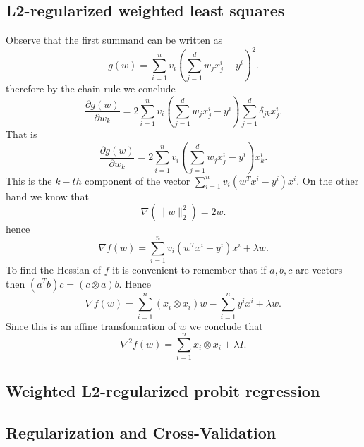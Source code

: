 \documentclass{article}
\begin{document}
\subsection{L2-regularized weighted least squares}
Observe that the first summand   can be written as
\begin{equation*}
g(w)=\sum_{i=1}^{n}v_{i}(\sum_{j=1}^{d}w_{j}x_{j}^{i}-y^{i})^{2}.
\end{equation*}
therefore by the chain rule we conclude
\begin{equation*}
\frac{\partial g(w)}{\partial w_{k}}=2\sum_{i=1}^{n}v_{i}(\sum_{j=1}^{d}w_{j}x_{j}^{i}-y^{i})\sum_{j=1}^{d}\delta_{jk}x_{j}^{i}.
\end{equation*}
That is
\begin{equation*}
\frac{\partial g(w)}{\partial w_{k}}=2\sum_{i=1}^{n}v_{i}(\sum_{j=1}^{d}w_{j}x_{j}^{i}-y^{i})x_{k}^{i}.
\end{equation*}
This is the $k-th$ component of the vector $\sum_{i=1}^{n}v_{i}(w^{T}x^{i}-y^{i})x^{i}$. On the other hand we know that
\begin{equation*}
\nabla(\|w\|_{2}^{2})=2w.
\end{equation*}
hence
\begin{equation*}
\nabla f(w)=\sum_{i=1}^{n}v_{i}(w^{T}x^{i}-y^{i})x^{i}+\lambda w.
\end{equation*}
To find the Hessian of $f$ it is convenient to remember that if $a,b,c$ are vectors then $(a^{T}b)c=(c\otimes a)b$.
Hence
\begin{equation*}
\nabla f(w)=\sum_{i=1}^{n}(x_{i}\otimes x_{i})w-\sum_{i=1}^{n}y^{i}x^{i}+\lambda w.
\end{equation*}
Since this is an affine transfomration of $w$ we conclude that
\begin{equation*}
\nabla^{2}f(w)=\sum_{i=1}^{n}x_{i}\otimes x_{i}+\lambda I.
\end{equation*}

\subsection{Weighted L2-regularized probit regression}











\subsection{Regularization and Cross-Validation}
\end{document}

